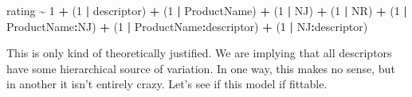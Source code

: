 \documentclass[
]{book}
\newenvironment{Shaded}{\begin{snugshade}}{\end{snugshade}}
\newcommand{\DecValTok}[1]{\textcolor[rgb]{0.00,0.00,0.81}{#1}}
\newcommand{\NormalTok}[1]{#1}
\newcommand{\SpecialCharTok}[1]{\textcolor[rgb]{0.81,0.36,0.00}{\textbf{#1}}}
\begin{document}
\begin{Shaded}
\begin{Highlighting}[]
\NormalTok{rating }\SpecialCharTok{\textasciitilde{}} \DecValTok{1} \SpecialCharTok{+}\NormalTok{ (}\DecValTok{1} \SpecialCharTok{|}\NormalTok{ descriptor) }\SpecialCharTok{+}\NormalTok{ (}\DecValTok{1} \SpecialCharTok{|}\NormalTok{ ProductName) }\SpecialCharTok{+}\NormalTok{ (}\DecValTok{1} \SpecialCharTok{|}\NormalTok{ NJ) }\SpecialCharTok{+}\NormalTok{ (}\DecValTok{1} \SpecialCharTok{|}\NormalTok{ NR) }\SpecialCharTok{+} 
\NormalTok{  (}\DecValTok{1} \SpecialCharTok{|}\NormalTok{ ProductName}\SpecialCharTok{:}\NormalTok{NJ) }\SpecialCharTok{+}\NormalTok{ (}\DecValTok{1} \SpecialCharTok{|}\NormalTok{ ProductName}\SpecialCharTok{:}\NormalTok{descriptor) }\SpecialCharTok{+}\NormalTok{ (}\DecValTok{1} \SpecialCharTok{|}\NormalTok{ NJ}\SpecialCharTok{:}\NormalTok{descriptor)}
\end{Highlighting}
\end{Shaded}

This is only kind of theoretically justified. We are implying that all descriptors have some hierarchical source of variation. In one way, this makes no sense, but in another it isn't entirely crazy. Let's see if this model if fittable.
\end{document}
